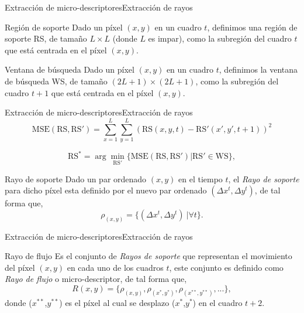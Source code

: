 \documentclass{beamer}
\begin{document}
    
        \begin{frame}{Extracción de micro-descriptores}{Extracción de rayos}
            \begin{block}{Región de soporte}
                  Dado un píxel $(x,y)$ en un cuadro $t$, definimos una región de soporte RS, de tamaño $L \times L$ (donde $L$ es impar), como la subregión del cuadro $t$ que está centrada en el píxel $(x,y)$.
            \end{block}
            
            \begin{block}{Ventana de búsqueda}
                  Dado un píxel $(x,y)$ en un cuadro $t$, definimos la ventana de búsqueda WS, de  tamaño $(2L+1) \times (2L+1)$, como la subregión del cuadro $t+1$ que está centrada en el píxel $(x,y)$.
            \end{block}
    
        \end{frame}
    

        \begin{frame}{Extracción de micro-descriptores}{Extracción de rayos}
            \begin{equation}\label{algoritmo:eq:mse}	
			    \text{MSE}(\text{RS}, \text{RS}') = \sum_{x=1}^{L} \sum_{y=1}^{L} (\text{RS}(x,y,t) - \text{RS}'(x',y', t+1))^2
		    \end{equation}   
		    
		    \begin{equation}
		        \text{RS}^* = \arg \min_{\text{RS}'}\{\text{MSE}(\text{RS},\text{RS}') | \text{RS}' \in \text{WS} \},
	        \end{equation}	
	        
	        \begin{block}{Rayo de soporte}
                Dado un par ordenado $(x,y)$ en el tiempo $t$, el \textit{Rayo de soporte} para dicho píxel esta definido por el nuevo par ordenado $(\Delta x^{t}, \Delta y^{t})$, de tal forma que,
		\begin{equation}
			\rho_{(x,y)} = \{(\Delta x^{t}, \Delta y^{t})~| \forall t\}.
		\end{equation}		 
            \end{block}
        \end{frame}
        
        
        \begin{frame}{Extracción de micro-descriptores}{Extracción de rayos}
            \begin{block}{Rayo de flujo}
                Es el conjunto de \textit{Rayos de soporte} que representan el movimiento del píxel $(x,y)$ en cada uno de los cuadros $t$, este conjunto es definido como \textit{Rayo de flujo} o micro-descriptor, de tal forma que,
			\begin{equation}
				R(x,y)	 = \{\rho_{(x,y)}, \rho_{(x^*,y^*)}, \rho_{(x^{**},y^{**})}, ... \},
			\end{equation}
		donde ($x^{**}$,$y^{**}$) es el píxel al cual se desplazo ($x^{*}$,$y^{*}$) en el cuadro $t+2$.  
            \end{block}
    
        \end{frame}
        
\end{document}

